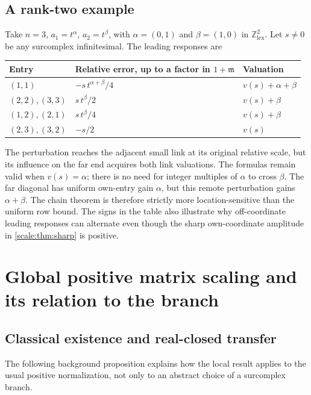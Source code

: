 \documentclass[11pt,a4paper]{article}
\numberwithin{equation}{section}
\theoremstyle{definition}
\newcommand{\Z}{\mathbb Z}
\newcommand{\mm}{\mathfrak m}
\begin{document}
\subsection{A rank-two example}
Take $n=3$, $a_1=t^\alpha$, $a_2=t^\beta$, with
$\alpha=(0,1)$ and $\beta=(1,0)$ in $\Z^2_{\mathrm{lex}}$.
Let $s\ne0$ be any surcomplex infinitesimal. The leading responses are
\begin{center}
\begin{tabular}{@{}lll@{}}
\toprule
Entry & Relative error, up to a factor in $1+\mm$ & Valuation\\
\midrule
$(1,1)$ & $-s\,t^{\alpha+\beta}/4$ & $v(s)+\alpha+\beta$\\
$(2,2),(3,3)$ & $s\,t^\beta/2$ & $v(s)+\beta$\\
$(1,2),(2,1)$ & $s\,t^\beta/4$ & $v(s)+\beta$\\
$(2,3),(3,2)$ & $-s/2$ & $v(s)$\\
\bottomrule
\end{tabular}
\end{center}
The perturbation reaches the adjacent small link at its original
relative scale, but its influence on the far end acquires both
link valuations. The formulas remain valid when $v(s)=\alpha$;
there is no need for integer multiples of $\alpha$ to cross $\beta$.
The far diagonal has uniform own-entry gain $\alpha$, but this remote
perturbation gains $\alpha+\beta$. The chain theorem is therefore
strictly more location-sensitive than the uniform row bound.
The signs in the table also illustrate why off-coordinate leading
responses can alternate even though the sharp own-coordinate
amplitude in \cref{scale:thm:sharp} is positive.

\section{Global positive matrix scaling and its relation to the branch}
\label{scale:sec:global}

\subsection{Classical existence and real-closed transfer}
The following background proposition explains how the local result
applies to the usual positive normalization, not only to an abstract
choice of a surcomplex branch.
\end{document}
